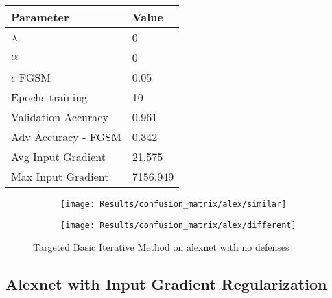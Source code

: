 \documentclass[draft,final]{vutinfth} %
\begin{document}
\begin{table}[h]
  \centering
  \begin{tabular}{ll}
    \toprule
			Parameter			& Value   \\
    \midrule
			$\lambda$								& 0				\\
			$\alpha$								& 0				\\
			$\epsilon$ FGSM					& 0.05		\\
			Epochs training					& 10			\\
			
			Validation Accuracy			& 0.961		\\
			Adv Accuracy - FGSM			& 0.342		\\
			
			Avg Input Gradient			& 21.575	\\
			Max Input Gradient			& 7156.949\\
    \bottomrule
  \end{tabular}
\end{table}


\begin{figure}[h]
  \begin{subfigure}[b]{0.5\columnwidth}
		\centering
    \texttt{[image: Results/confusion\_matrix/alex/similar]}%
    \label{fig:exp:cm:alex:similar}
  \end{subfigure}
  \begin{subfigure}[b]{0.5\columnwidth}
		\centering
    \texttt{[image: Results/confusion\_matrix/alex/different]}
    \label{fig:exp:cm:alex:different}
  \end{subfigure}
  \caption{Targeted Basic Iterative Method on alexnet with no defenses}
	\label{fig:exp:cm:alex}
\end{figure}
\clearpage

\subsection{Alexnet with Input Gradient Regularization}
\end{document}
